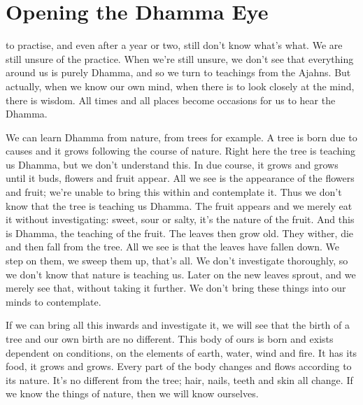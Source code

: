 
\chapter{Opening the Dhamma Eye}

\vspace*{0.5\baselineskip}
 to practise, and even after a year or two, still don't know what's what. We are still unsure of the practice. When we're still unsure, we don't see that everything around us is purely Dhamma, and so we turn to teachings from the Ajahns. But actually, when we know our own mind, when there is  to look closely at the mind, there is wisdom. All times and all places become occasions for us to hear the Dhamma. 

We can learn Dhamma from nature, from trees for example. A tree is born due to causes and it grows following the course of nature. Right here the tree is teaching us Dhamma, but we don't understand this. In due course, it grows and grows until it buds, flowers and fruit appear. All we see is the appearance of the flowers and fruit; we're unable to bring this within and contemplate it. Thus we don't know that the tree is teaching us Dhamma. The fruit appears and we merely eat it without investigating: sweet, sour or salty, it's the nature of the fruit. And this is Dhamma, the teaching of the fruit. The leaves then grow old. They wither, die and then fall from the tree. All we see is that the leaves have fallen down. We step on them, we sweep them up, that's all. We don't investigate thoroughly, so we don't know that nature is teaching us. Later on the new leaves sprout, and we merely see that, without taking it further. We don't bring these things into our minds to contemplate. 

If we can bring all this inwards and investigate it, we will see that the birth of a tree and our own birth are no different. This body of ours is born and exists dependent on conditions, on the elements of earth, water, wind and fire. It has its food, it grows and grows. Every part of the body changes and flows according to its nature. It's no different from the tree; hair, nails, teeth and skin all change. If we know the things of nature, then we will know ourselves. 

